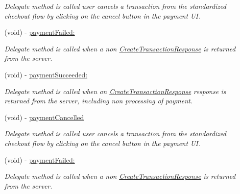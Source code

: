 \begin{DoxyCompactItemize}
\begin{DoxyCompactList}\small\item\em Delegate method is called user cancels a transaction from the standardized checkout flow by clicking on the cancel button in the payment UI. \item\end{DoxyCompactList}\item 
(void) -\/ \hyperlink{protocol_auth_net_delegate-p_a93b8bf1be8cf23af9c53eadd3e3566b3}{paymentFailed:}
\begin{DoxyCompactList}\small\item\em Delegate method is called when a non \hyperlink{interface_create_transaction_response}{CreateTransactionResponse} is returned from the server. \item\end{DoxyCompactList}\item 
\hypertarget{protocol_auth_net_delegate-p_a83216768724bb11ffb35836d1c26b3a9}{
(void) -\/ \hyperlink{protocol_auth_net_delegate-p_a83216768724bb11ffb35836d1c26b3a9}{paymentSucceeded:}}
\label{protocol_auth_net_delegate-p_a83216768724bb11ffb35836d1c26b3a9}

\begin{DoxyCompactList}\small\item\em Delegate method is called when an \hyperlink{interface_create_transaction_response}{CreateTransactionResponse} response is returned from the server, including non processing of payment. \item\end{DoxyCompactList}\item 
\hypertarget{protocol_auth_net_delegate-p_a85de6c31d6fd6190b54f66b33cd2c7b0}{
(void) -\/ \hyperlink{protocol_auth_net_delegate-p_a85de6c31d6fd6190b54f66b33cd2c7b0}{paymentCancelled}}
\label{protocol_auth_net_delegate-p_a85de6c31d6fd6190b54f66b33cd2c7b0}

\begin{DoxyCompactList}\small\item\em Delegate method is called user cancels a transaction from the standardized checkout flow by clicking on the cancel button in the payment UI. \item\end{DoxyCompactList}\item 
(void) -\/ \hyperlink{protocol_auth_net_delegate-p_a93b8bf1be8cf23af9c53eadd3e3566b3}{paymentFailed:}
\begin{DoxyCompactList}\small\item\em Delegate method is called when a non \hyperlink{interface_create_transaction_response}{CreateTransactionResponse} is returned from the server. \item\end{DoxyCompactList}\end{DoxyCompactItemize}


